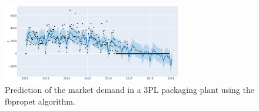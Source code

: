 \begin{figure}[hbt!]
\centering
\includegraphics[width=0.7\textwidth]{sectionProduction/control_figures/fig_prod_CHIMAR_fbprophet.png}
\captionsetup{type=figure}
\caption{Prediction of the market demand in a 3PL packaging plant using the fbpropet algorithm.}
\label{fig_prod_CHIMAR_fbprophet}
\end{figure}










